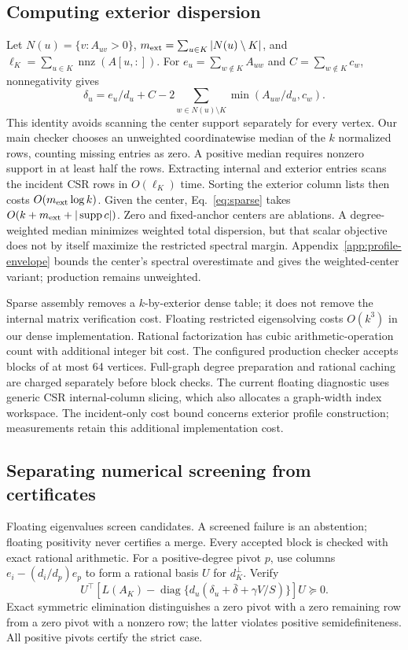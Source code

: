 \documentclass[sigconf,anonymous,review]{acmart}
\newcommand{\1}{\mathbf{1}}
\newcommand{\diag}{\operatorname{diag}}
\begin{document}
\subsection{Computing exterior dispersion}
Let $N(u)=\{v:A_{uv}>0\}$, $m_{\rm ext}=\sum_{u\in K}|N(u)\setminus K|$,
and $\ell_K=\sum_{u\in K}\operatorname{nnz}(A[u,:])$.
For $e_u=\sum_{w\notin K}A_{uw}$ and $C=\sum_{w\notin K}c_w$, nonnegativity
gives
\begin{equation}
 \delta_u=e_u/d_u+C-
 2\sum_{w\in N(u)\setminus K}\min(A_{uw}/d_u,c_w).
 \label{eq:sparse}
\end{equation}
This identity avoids scanning the center support separately for every vertex.
Our main checker chooses an unweighted coordinatewise median of the $k$
normalized rows, counting missing entries as zero. A positive median requires
nonzero support in at least half the rows. Extracting internal and exterior
entries scans the incident CSR rows in $O(\ell_K)$ time. Sorting the exterior
column lists then costs $O(m_{\rm ext}\log k)$. Given the
center, Eq.~\eqref{eq:sparse} takes $O(k+m_{\rm ext}+|\operatorname{supp}c|)$.
Zero and fixed-anchor centers are ablations. A degree-weighted median minimizes
weighted total dispersion, but that scalar objective does not by itself
maximize the restricted spectral margin.
Appendix~\ref{app:profile-envelope} bounds the center's spectral overestimate
and gives the weighted-center variant; production remains unweighted.

Sparse assembly removes a $k$-by-exterior dense table; it does not remove the
internal matrix verification cost. Floating restricted eigensolving costs
$O(k^3)$ in our dense implementation. Rational factorization has cubic
arithmetic-operation count with additional integer bit cost. The configured
production checker accepts blocks of at most 64 vertices. Full-graph degree
preparation and rational caching are charged separately before block checks.
The current floating diagnostic uses generic CSR internal-column slicing,
which also allocates a graph-width index workspace. The incident-only cost
bound concerns exterior profile construction; measurements retain this
additional implementation cost.

\subsection{Separating numerical screening from certificates}
Floating eigenvalues screen candidates. A screened failure is an abstention;
floating positivity never certifies a merge. Every accepted block is checked
with exact rational arithmetic. For a positive-degree pivot $p$, use columns
$e_i-(d_i/d_p)e_p$ to form a rational basis $U$ for $d_K^\perp$. Verify
\begin{equation}
 U^\top\left[L(A_K)-\diag\{d_u(\delta_u+\bar\delta+\gamma V/S)\}\right]U
 \succeq 0.\label{eq:rational}
\end{equation}
Exact symmetric elimination distinguishes a zero pivot with a zero remaining
row from a zero pivot with a nonzero row; the latter violates positive
semidefiniteness. All positive pivots certify the strict case.
\end{document}
